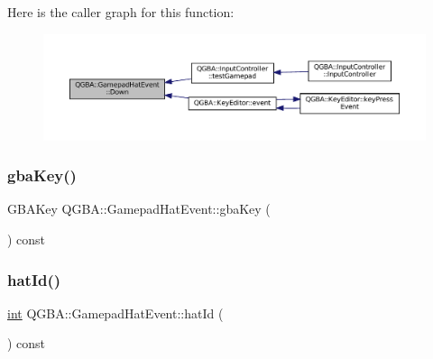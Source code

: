 Here is the caller graph for this function\+:
\nopagebreak
\begin{figure}[H]
\begin{center}
\leavevmode
\includegraphics[width=350pt]{class_q_g_b_a_1_1_gamepad_hat_event_acd067a14064dc04959c60a5c65d74e2c_icgraph}
\end{center}
\end{figure}
\mbox{\label{class_q_g_b_a_1_1_gamepad_hat_event_ae1e5e82556996d69ff9906bbe3e7bf74}} 
\subsubsection{\texorpdfstring{gba\+Key()}{gbaKey()}}
{\footnotesize\ttfamily G\+B\+A\+Key Q\+G\+B\+A\+::\+Gamepad\+Hat\+Event\+::gba\+Key (\begin{DoxyParamCaption}{ }\end{DoxyParamCaption}) const\hspace{0.3cm}{\ttfamily [inline]}}

\mbox{\label{class_q_g_b_a_1_1_gamepad_hat_event_a2128bd4e5dd8a0b9c403c1a67adb092f}} 
\subsubsection{\texorpdfstring{hat\+Id()}{hatId()}}
{\footnotesize\ttfamily \mbox{\hyperlink{ioapi_8h_a787fa3cf048117ba7123753c1e74fcd6}{int}} Q\+G\+B\+A\+::\+Gamepad\+Hat\+Event\+::hat\+Id (\begin{DoxyParamCaption}{ }\end{DoxyParamCaption}) const\hspace{0.3cm}{\ttfamily [inline]}}

